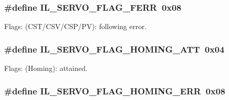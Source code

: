 \subsubsection[{\texorpdfstring{I\+L\+\_\+\+S\+E\+R\+V\+O\+\_\+\+F\+L\+A\+G\+\_\+\+F\+E\+RR}{IL_SERVO_FLAG_FERR}}]{\setlength{\rightskip}{0pt plus 5cm}\#define I\+L\+\_\+\+S\+E\+R\+V\+O\+\_\+\+F\+L\+A\+G\+\_\+\+F\+E\+RR~0x08}\hypertarget{group__IL__SERVO_gaa782f00113ceb5b0582471b8fe86a628}{}\label{group__IL__SERVO_gaa782f00113ceb5b0582471b8fe86a628}


Flags\+: (C\+S\+T/\+C\+S\+V/\+C\+S\+P/\+PV)\+: following error. 

\subsubsection[{\texorpdfstring{I\+L\+\_\+\+S\+E\+R\+V\+O\+\_\+\+F\+L\+A\+G\+\_\+\+H\+O\+M\+I\+N\+G\+\_\+\+A\+TT}{IL_SERVO_FLAG_HOMING_ATT}}]{\setlength{\rightskip}{0pt plus 5cm}\#define I\+L\+\_\+\+S\+E\+R\+V\+O\+\_\+\+F\+L\+A\+G\+\_\+\+H\+O\+M\+I\+N\+G\+\_\+\+A\+TT~0x04}\hypertarget{group__IL__SERVO_ga683ef09e3c3e8133cfe1332a067cb88a}{}\label{group__IL__SERVO_ga683ef09e3c3e8133cfe1332a067cb88a}


Flags\+: (Homing)\+: attained. 

\subsubsection[{\texorpdfstring{I\+L\+\_\+\+S\+E\+R\+V\+O\+\_\+\+F\+L\+A\+G\+\_\+\+H\+O\+M\+I\+N\+G\+\_\+\+E\+RR}{IL_SERVO_FLAG_HOMING_ERR}}]{\setlength{\rightskip}{0pt plus 5cm}\#define I\+L\+\_\+\+S\+E\+R\+V\+O\+\_\+\+F\+L\+A\+G\+\_\+\+H\+O\+M\+I\+N\+G\+\_\+\+E\+RR~0x08}\hypertarget{group__IL__SERVO_gaa8b47a602774d828155efbc452bfbe66}{}\label{group__IL__SERVO_gaa8b47a602774d828155efbc452bfbe66}


